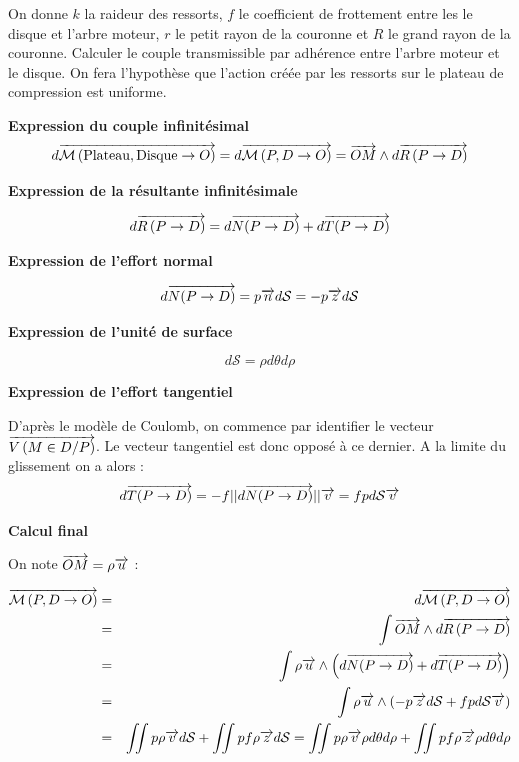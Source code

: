 \documentclass[10pt]{article}
\begin{document}
\begin{exemple}
On donne $k$ la raideur des ressorts, $f$ le coefficient de frottement entre les le disque et l'arbre moteur, $r$ le petit rayon de la couronne et $R$ le grand rayon de la couronne. Calculer le couple transmissible par adhérence entre l'arbre moteur et le disque. On fera l'hypothèse que l'action créée par les ressorts sur le plateau de compression est uniforme. 

\textbf{Expression du couple infinitésimal}
$$
d\overrightarrow{\mathcal{M}\left( {\text{Plateau}}, {\text{Disque}} \rightarrow {O}\right)} =
d\overrightarrow{\mathcal{M}\left( {P}, {D} \rightarrow {O}\right)} =  \overrightarrow{OM}\wedge d\overrightarrow{R\left( {P} \rightarrow {D}\right)}
$$

\textbf{Expression de la résultante infinitésimale}

$$
d\overrightarrow{R\left( {P} \rightarrow {D}\right)} = d\overrightarrow{N(P\rightarrow D)}+d\overrightarrow{T(P\rightarrow D)}
$$

\textbf{Expression de l'effort normal}

$$
d\overrightarrow{N(P\rightarrow D)} = p \overrightarrow{n} d\mathcal{S} = -p \overrightarrow{z} d\mathcal{S}
$$

\textbf{Expression de l'unité de surface}

$$
d\mathcal{S} = \rho d\theta d\rho
$$

\textbf{Expression de l'effort tangentiel}

D'après le modèle de Coulomb, on commence par identifier le vecteur $\overrightarrow{V\left( {M} \in {D}/{P}\right)}$.
Le vecteur tangentiel est donc opposé à ce dernier. A la limite du glissement on a alors : 
$$
d\overrightarrow{T(P\rightarrow D)} = -f ||d\overrightarrow{N(P\rightarrow D)}|| \overrightarrow{v}    = fp d\mathcal{S}\overrightarrow{v}
$$

\textbf{Calcul final}

On note $\overrightarrow{OM}=\rho\overrightarrow{u}$ :

\begin{eqnarray*}
\overrightarrow{\mathcal{M}\left( {P}, {D} \rightarrow {O}\right)}  
&=& d\overrightarrow{\mathcal{M}\left( {P}, {D} \rightarrow {O}\right)}  \\
&=& \int \overrightarrow{OM}\wedge d\overrightarrow{R\left( {P} \rightarrow {D}\right)} \\
&=& \int \rho\overrightarrow{u} \wedge \left( d\overrightarrow{N(P\rightarrow D)}+d\overrightarrow{T(P\rightarrow D)} \right)\\
&=& \int \rho\overrightarrow{u} \wedge \left( -p \overrightarrow{z} d\mathcal{S} +fp d\mathcal{S}\overrightarrow{v} \right)\\
&=& \iint p\rho\overrightarrow{v} d\mathcal{S} +\iint pf\rho  \overrightarrow{z}d\mathcal{S} = 
\iint p\rho\overrightarrow{v} \rho d\theta d\rho +\iint pf\rho  \overrightarrow{z}\rho d\theta d\rho \\
\end{eqnarray*}


\end{exemple}
\end{document}
